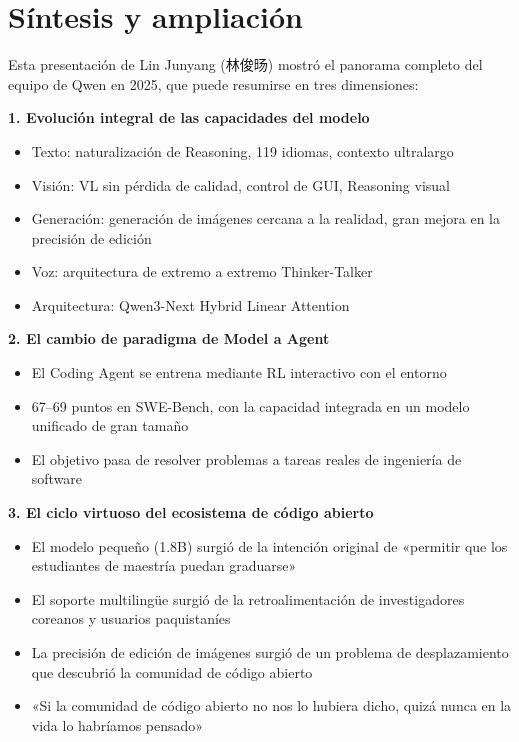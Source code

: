 \section{Síntesis y ampliación}

Esta presentación de Lin Junyang (林俊旸) mostró el panorama completo del equipo de Qwen en 2025, que puede resumirse en tres dimensiones:

\textbf{1. Evolución integral de las capacidades del modelo}
\begin{itemize}
    \item Texto: naturalización de Reasoning, 119 idiomas, contexto ultralargo
    \item Visión: VL sin pérdida de calidad, control de GUI, Reasoning visual
    \item Generación: generación de imágenes cercana a la realidad, gran mejora en la precisión de edición
    \item Voz: arquitectura de extremo a extremo Thinker-Talker
    \item Arquitectura: Qwen3-Next Hybrid Linear Attention
\end{itemize}

\textbf{2. El cambio de paradigma de Model a Agent}
\begin{itemize}
    \item El Coding Agent se entrena mediante RL interactivo con el entorno
    \item 67--69 puntos en SWE-Bench, con la capacidad integrada en un modelo unificado de gran tamaño
    \item El objetivo pasa de resolver problemas a tareas reales de ingeniería de software
\end{itemize}

\textbf{3. El ciclo virtuoso del ecosistema de código abierto}
\begin{itemize}
    \item El modelo pequeño (1.8B) surgió de la intención original de «permitir que los estudiantes de maestría puedan graduarse»
    \item El soporte multilingüe surgió de la retroalimentación de investigadores coreanos y usuarios paquistaníes
    \item La precisión de edición de imágenes surgió de un problema de desplazamiento que descubrió la comunidad de código abierto
    \item «Si la comunidad de código abierto no nos lo hubiera dicho, quizá nunca en la vida lo habríamos pensado»
\end{itemize}


